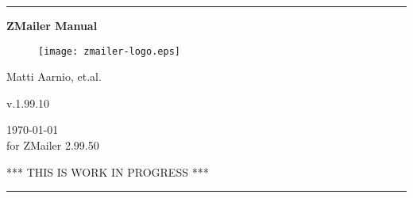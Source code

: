 \documentclass[twoside,twocolumn,a4paper,draft]{book}
\newcommand{\ZMailerManual}{ZMailer Manual}
\newcommand{\ZManVersion}{v.1.99.10}
\begin{document}
\startdocument

\begin{titlepage}
\rule{\textwidth}{1mm}
\begin{center}
\bf
\Huge
\vspace{2ex}
\ZMailerManual \\
\vspace{2ex}

\begin{htmlonly}
\end{htmlonly}

\begin{figure}[h]
  \texttt{[image: zmailer-logo.eps]}
\end{figure}
\vspace{2ex}

\Large
Matti Aarnio, et.al. \\
\vspace{2ex}
\begin{htmlonly}
\vspace{1ex}
\end{htmlonly}
\ZManVersion \\
\date \\
\today \\
for ZMailer 2.99.50 \\
\vspace{2ex}
\begin{htmlonly}
\vspace{1ex}
\end{htmlonly}
\Large
\sf
*** THIS IS WORK IN PROGRESS ***
\end{center}
\vfill
\rule{\textwidth}{1mm}
\end{titlepage}

\cleardoublepage


%
\end{document}
